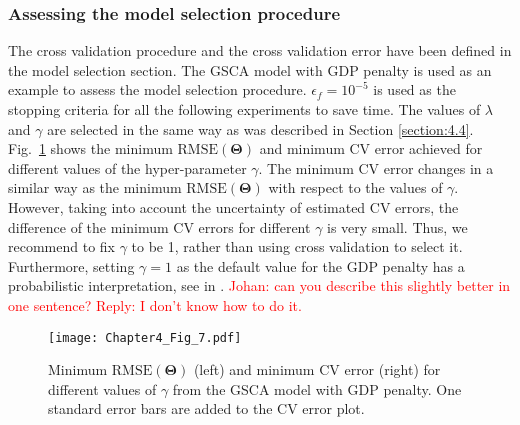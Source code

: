\subsubsection{Assessing the model selection procedure}
The cross validation procedure and the cross validation error have been defined in the model selection section. The GSCA model with GDP penalty is used as an example to assess the model selection procedure. $\epsilon_f=10^{-5}$ is used as the stopping criteria for all the following experiments to save time. The values of $\lambda$ and $\gamma$ are selected in the same way as was described in Section \ref{section:4.4}. Fig.~\ref{chapter4_fig:7} shows the minimum $\text{RMSE}(\mathbf{\Theta})$ and minimum CV error achieved for different values of the hyper-parameter $\gamma$. The minimum CV error changes in a similar way as the minimum $\text{RMSE}(\mathbf{\Theta})$ with respect to the values of $\gamma$. However, taking into account the uncertainty of estimated CV errors, the difference of the minimum CV errors for different $\gamma$ is very small. Thus, we recommend to fix $\gamma$ to be 1, rather than using cross validation to select it. Furthermore, setting $\gamma = 1$ as the default value for the GDP penalty has a probabilistic interpretation, see in \cite{armagan2013generalized}. \textcolor{red}{Johan: can you describe this slightly better in one sentence? Reply: I don't know how to do it.}
\begin{figure}[htbp]
    \centering
    \texttt{[image: Chapter4\_Fig\_7.pdf]}
    \caption{Minimum $\text{RMSE}(\mathbf{\Theta})$ (left) and minimum CV error (right) for different values of $\gamma$ from the GSCA model with GDP penalty. One standard error bars are added to the CV error plot.}
\label{chapter4_fig:7}
\end{figure}

